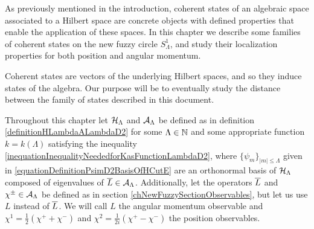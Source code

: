 










As previously mentioned in the introduction, coherent states of an algebraic space associated to a Hilbert space  are concrete objects with defined properties that enable the application of these spaces. In this chapter we describe some families of coherent states on the new fuzzy circle $S^1_\Lambda$, and study their localization properties for both position and angular momentum. 

Coherent states are vectors of the underlying Hilbert spaces, and so they induce states of the algebra. Our purpose will be to eventually study the distance between the family of states described in this document.

Throughout this chapter let $\mathcal H_\Lambda$ and $\mathcal A_\Lambda$ be defined as in definition \ref{definitionHLambdaALambdaD2} for some $\Lambda \in \mathbb{N}$ and some appropriate function $k = k(\Lambda)$ satisfying the inequality \eqref{inequationInequalityNeededforKasFunctionLambdaD2}, where $\{\psi_m\}_{|m| \leq \Lambda}$ given in \eqref{equationDefinitionPsimD2BasisOfHCutE} are an orthonormal basis of $\mathcal H_\Lambda$ composed of eigenvalues of $\overline{L} \in \mathcal A_\Lambda$. Additionally, let the operators $\overline{L}$ and $\chi^\pm \in \mathcal A_\Lambda$ be defined as in section \ref{chNewFuzzySectionObservables}, but let us use $L$ instead of $\overline{L}$. We will call $L$ the angular momentum observable and $\chi^1 = \frac{1}{2}(\chi^+ + \chi^-)$ and $\chi^2 = \frac{1}{2i}(\chi^+ - \chi^-)$ the position observables.

